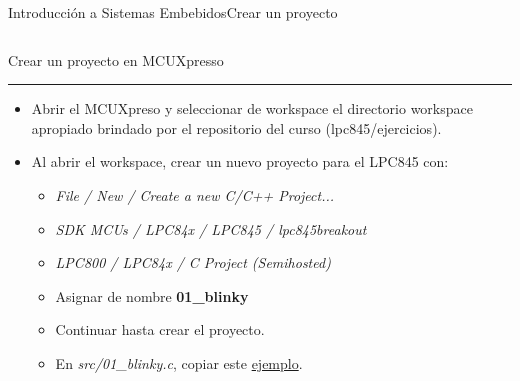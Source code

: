\documentclass[aspectratio=169, xcolor=dvipsnames]{beamer}
\begin{document}
\begin{frame}{Introducción a Sistemas Embebidos}{Crear un proyecto}
\begin{columns}
\begin{column}{0.75\textwidth}
    Crear un proyecto en MCUXpresso
    \noindent\rule{\textwidth}{0.75pt}
    \begin{itemize}
        \item Abrir el MCUXpreso y seleccionar de workspace el directorio workspace apropiado brindado por el repositorio del curso (lpc845/ejercicios).
        \item Al abrir el workspace, crear un nuevo proyecto para el LPC845 con:
            \begin{itemize}
                \item \textit{File / New / Create a new C/C++ Project...}
                \item \textit{SDK MCUs / LPC84x / LPC845 / lpc845breakout}
                \item \textit{LPC800 / LPC84x / C Project (Semihosted)}
                \item Asignar de nombre \textbf{01\_blinky}
                \item Continuar hasta crear el proyecto.
                \item En \textit{src/01\_blinky.c}, copiar este \href{https://github.com/utn-fra-lse/lpc845/blob/af536a2eef9075f1271c5c03d08e3999b701b55e/ejemplos/01_blinky/src/01_blinky.c}{ejemplo}.
            \end{itemize}
    \end{itemize}
\end{column}
\end{columns}
\end{frame}
\end{document}
